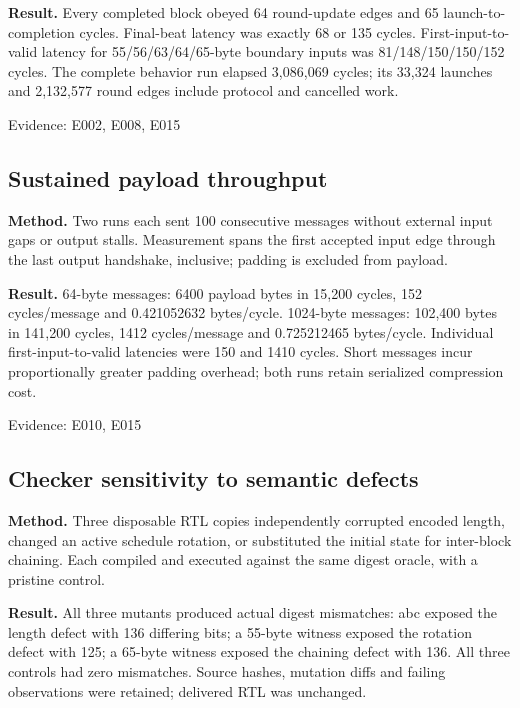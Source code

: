 \documentclass[11pt,a4paper]{article}
\begin{document}
\textbf{Result.} Every completed block obeyed 64 round-update edges and 65 launch-to-completion cycles. Final-beat latency was exactly 68 or 135 cycles. First-input-to-valid latency for 55/\allowbreak{}56/\allowbreak{}63/\allowbreak{}64/\allowbreak{}65-byte boundary inputs was 81/\allowbreak{}148/\allowbreak{}150/\allowbreak{}150/\allowbreak{}152 cycles. The complete behavior run elapsed 3,\allowbreak{}086,\allowbreak{}069 cycles; its 33,\allowbreak{}324 launches and 2,\allowbreak{}132,\allowbreak{}577 round edges include protocol and cancelled work.

{\small Evidence: E002,\allowbreak{} E008,\allowbreak{} E015}

\subsection{Sustained payload throughput}

\textbf{Method.} Two runs each sent 100 consecutive messages without external input gaps or output stalls. Measurement spans the first accepted input edge through the last output handshake,\allowbreak{} inclusive; padding is excluded from payload.

\textbf{Result.} 64-byte messages: 6400 payload bytes in 15,\allowbreak{}200 cycles,\allowbreak{} 152 cycles/\allowbreak{}message and 0.421052632 bytes/\allowbreak{}cycle. 1024-byte messages: 102,\allowbreak{}400 bytes in 141,\allowbreak{}200 cycles,\allowbreak{} 1412 cycles/\allowbreak{}message and 0.725212465 bytes/\allowbreak{}cycle. Individual first-input-to-valid latencies were 150 and 1410 cycles. Short messages incur proportionally greater padding overhead; both runs retain serialized compression cost.

{\small Evidence: E010,\allowbreak{} E015}

\subsection{Checker sensitivity to semantic defects}

\textbf{Method.} Three disposable RTL copies independently corrupted encoded length,\allowbreak{} changed an active schedule rotation,\allowbreak{} or substituted the initial state for inter-block chaining. Each compiled and executed against the same digest oracle,\allowbreak{} with a pristine control.

\textbf{Result.} All three mutants produced actual digest mismatches: abc exposed the length defect with 136 differing bits; a 55-byte witness exposed the rotation defect with 125; a 65-byte witness exposed the chaining defect with 136. All three controls had zero mismatches. Source hashes,\allowbreak{} mutation diffs and failing observations were retained; delivered RTL was unchanged.
\end{document}
